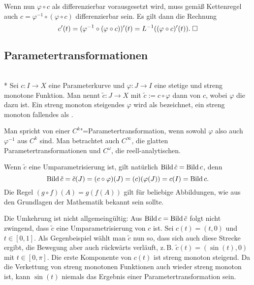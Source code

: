 Wenn nun $\varphi\circ c$ als differenzierbar vorausgesetzt wird,
muss gemäß Kettenregel auch $c=\varphi^{-1}\circ(\varphi\circ c)$
differenzierbar sein. Es gilt dann die Rechnung
\begin{equation}
c'(t) = (\varphi^{-1}\circ(\varphi\circ c))'(t)
= L^{-1}((\varphi\circ c)'(t)).\;\Box
\end{equation}

\pagebreak
\subsection{Parametertransformationen}

\begin{definition}%
\mbox{}\\*
Sei $c\colon I\to X$ eine Parameterkurve und $\varphi\colon J\to I$
eine stetige und streng monotone Funktion. Man nennt
$\tilde c\colon J\to X$ mit $\tilde c:=c\circ\varphi$ dann
 von $c$, wobei $\varphi$ die
 dazu ist. Ein streng monoton steigendes
$\varphi$ wird als  bezeichnet,
ein streng monoton fallendes als .

Man spricht von einer $C^k$"=Parametertransformation, wenn sowohl
$\varphi$ also auch $\varphi^{-1}$ aus $C^k$ sind. Man betrachtet
auch $C^\infty$, die glatten Parametertransformationen und
$C^\omega$, die reell-analytischen.
\end{definition}

\noindent
Wenn $\tilde c$ eine Umparametrisierung ist, gilt natürlich
$\operatorname{Bild}\tilde c=\operatorname{Bild} c$, denn
\begin{equation}
\operatorname{Bild}\tilde c = \tilde c(J)
= (c\circ\varphi)(J) = (c)(\varphi(J))
= c(I) = \operatorname{Bild} c.
\end{equation}
Die Regel $(g\circ f)(A)=g(f(A))$ gilt für beliebige Abbildungen,
wie aus den Grundlagen der Mathematik bekannt sein sollte.

Die Umkehrung ist nicht allgemeingültig: Aus
$\operatorname{Bild} c=\operatorname{Bild}\tilde c$ folgt nicht zwingend, dass
$\tilde c$ eine Umparametrisierung von $c$ ist. Sei
$c(t)=(t,0)$ und $t\in[0,1]$. Als Gegenbeispiel wählt man
$\tilde c$ nun so, dass sich auch diese Strecke ergibt, die
Bewegung aber auch rückwärts verläuft, z.\,B. $\tilde c(t)=(\sin(t),0)$
mit $t\in[0,\pi]$. Die erste Komponente von $c(t)$ ist streng
monoton steigend. Da die Verkettung von streng monotonen Funktionen
auch wieder streng monoton ist, kann $\sin(t)$ niemals das Ergebnis
einer Parametertransformation sein.

